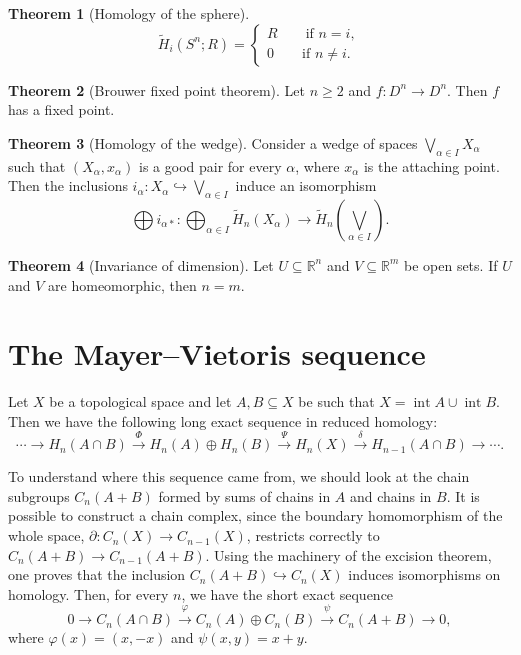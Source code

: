 \documentclass{book}
\theoremstyle{definition}
\newtheorem*{teo}{Theorem}
\newcommand{\R}{\mathbb{R}}
\DeclareMathOperator{\Int}{int}
\begin{document}
\begin{teo}[Homology of the sphere]
$$
\tilde H_i(S^n;R)=
\begin{cases}
R\qquad\text{if }n=i,\\
0\qquad\text{if }n\neq i.
\end{cases}
$$
\end{teo}

\begin{teo}[Brouwer fixed point theorem]
Let $n\geq2$ and $f:D^n\to D^n$. Then $f$ has a fixed point.
\end{teo}

\begin{teo}[Homology of the wedge]
Consider a wedge of spaces $\bigvee_{\alpha\in I}X_\alpha$
such that $(X_\alpha,x_\alpha)$ is a good pair for every
$\alpha$, where $x_\alpha$ is the attaching point. Then the
inclusions $i_\alpha:X_\alpha\hookrightarrow
\bigvee_{\alpha\in I}$ induce an isomorphism
$$
\bigoplus i_{\alpha *}:
\bigoplus_{\alpha\in I}\tilde H_n(X_\alpha)
\to
\tilde H_n\left(\bigvee_{\alpha\in I}\right).
$$
\end{teo}

\begin{teo}[Invariance of dimension]
Let $U\subseteq\R^n$ and $V\subseteq\R^m$ be open sets. If
$U$ and $V$ are homeomorphic, then $n=m$.
\end{teo}

\section{The Mayer--Vietoris sequence}

Let $X$ be a topological space and let $A,B\subseteq X$ be
such that $X=\Int A\cup\Int B$. Then we have the following
long exact sequence in reduced homology:
$$
\cdots\to H_n(A\cap B)\xrightarrow{\Phi}
H_n(A)\oplus H_n(B)\xrightarrow{\Psi}H_n(X)
\xrightarrow{\delta}H_{n-1}(A\cap B)\to\cdots.
$$

To understand where this sequence came from, we should look
at the chain subgroups $C_n(A+B)$ formed by sums of chains in
$A$ and chains in $B$. It is possible to construct a chain
complex, since the boundary homomorphism of the whole space,
$\partial:C_n(X)\to C_{n-1}(X)$, restricts correctly to
$C_n(A+B)\to C_{n-1}(A+B)$. Using the machinery of the
excision theorem, one proves that the inclusion
$C_n(A+B)\hookrightarrow C_n(X)$ induces isomorphisms on
homology. Then, for every $n$, we have the short exact
sequence
$$
0\to C_n(A\cap B)\xrightarrow{\varphi}
C_n(A)\oplus C_n(B)\xrightarrow{\psi}C_n(A+B)\to0,
$$
where $\varphi(x)=(x,-x)$ and $\psi(x,y)=x+y$.
\end{document}
